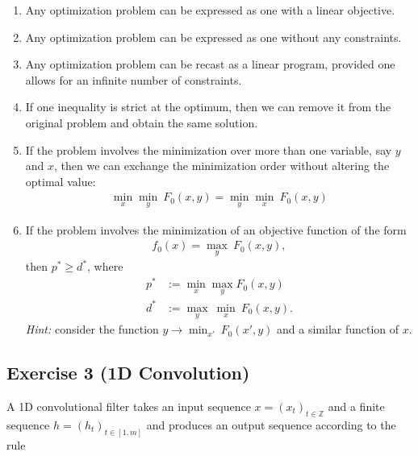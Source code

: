 \documentclass[11pt]{article}
\begin{document}
\begin{enumerate}
	\item Any optimization problem can be expressed as one with a linear objective.
	
	\item Any optimization problem can be expressed as one without any constraints.
	
	\item Any optimization problem can be recast as a linear program, provided one allows for an infinite number of constraints.
	
	\item If one inequality is strict at the optimum, then we can remove it from the original problem and obtain the same solution.
	
	\item If the problem involves the minimization over more than one variable, say $y$ and $x$, then we can exchange the minimization order without altering the optimal value:
    \begin{align*}
    	\min_x\min_y \: F_0(x,y) = \min_y\min_x \: F_0(x,y)
	\end{align*}
	
	\item If the problem involves the minimization of an objective function of the form
    \begin{align*}
    	f_0(x) = \max_y \: F_0(x,y),
	\end{align*}
    then $p^* \ge d^*$, where
    \begin{align*}
        p^* &:= \min_{x} \max_y F_0(x, y) \\
    	d^* &:= \max_y \: \min_{x} \: F_0(x,y).
	\end{align*}
	{\em Hint:} consider the function $y \rightarrow \min_{x'} \: F_0(x',y)$ and a similar function of $x$.
\end{enumerate}

\begin{solution}
\end{solution}

\newpage
\subsection*{Exercise 3 (1D Convolution)}

A 1D convolutional filter takes an input sequence $x = (x_t)_{t \in \mathbb{Z}}$ and a finite sequence $h = (h_t)_{t \in [1, m]}$ and produces an output sequence according to the rule
\end{document}
